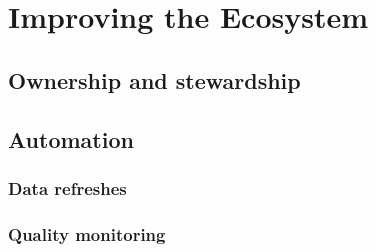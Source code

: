 \documentclass[
]{book}
\begin{document}
\hypertarget{improving-the-ecosystem}{%
\section{Improving the Ecosystem}\label{improving-the-ecosystem}}

\hypertarget{ownership-and-stewardship}{%
\subsection{Ownership and stewardship}\label{ownership-and-stewardship}}

\hypertarget{automation}{%
\subsection{Automation}\label{automation}}

\hypertarget{data-refreshes}{%
\subsubsection{Data refreshes}\label{data-refreshes}}

\hypertarget{quality-monitoring}{%
\subsubsection{Quality monitoring}\label{quality-monitoring}}

  
\end{document}

